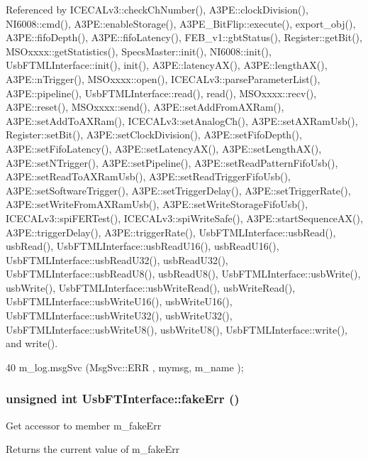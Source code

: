 Referenced by ICECALv3::checkChNumber(), A3PE::clockDivision(), NI6008::cmd(), A3PE::enableStorage(), A3PE\_\-BitFlip::execute(), export\_\-obj(), A3PE::fifoDepth(), A3PE::fifoLatency(), FEB\_\-v1::gbtStatus(), Register::getBit(), MSOxxxx::getStatistics(), SpecsMaster::init(), NI6008::init(), UsbFTMLInterface::init(), init(), A3PE::latencyAX(), A3PE::lengthAX(), A3PE::nTrigger(), MSOxxxx::open(), ICECALv3::parseParameterList(), A3PE::pipeline(), UsbFTMLInterface::read(), read(), MSOxxxx::recv(), A3PE::reset(), MSOxxxx::send(), A3PE::setAddFromAXRam(), A3PE::setAddToAXRam(), ICECALv3::setAnalogCh(), A3PE::setAXRamUsb(), Register::setBit(), A3PE::setClockDivision(), A3PE::setFifoDepth(), A3PE::setFifoLatency(), A3PE::setLatencyAX(), A3PE::setLengthAX(), A3PE::setNTrigger(), A3PE::setPipeline(), A3PE::setReadPatternFifoUsb(), A3PE::setReadToAXRamUsb(), A3PE::setReadTriggerFifoUsb(), A3PE::setSoftwareTrigger(), A3PE::setTriggerDelay(), A3PE::setTriggerRate(), A3PE::setWriteFromAXRamUsb(), A3PE::setWriteStorageFifoUsb(), ICECALv3::spiFERTest(), ICECALv3::spiWriteSafe(), A3PE::startSequenceAX(), A3PE::triggerDelay(), A3PE::triggerRate(), UsbFTMLInterface::usbRead(), usbRead(), UsbFTMLInterface::usbReadU16(), usbReadU16(), UsbFTMLInterface::usbReadU32(), usbReadU32(), UsbFTMLInterface::usbReadU8(), usbReadU8(), UsbFTMLInterface::usbWrite(), usbWrite(), UsbFTMLInterface::usbWriteRead(), usbWriteRead(), UsbFTMLInterface::usbWriteU16(), usbWriteU16(), UsbFTMLInterface::usbWriteU32(), usbWriteU32(), UsbFTMLInterface::usbWriteU8(), usbWriteU8(), UsbFTMLInterface::write(), and write().


\begin{DoxyCode}
40 { m_log.msgSvc (MsgSvc::ERR     , mymsg, m_name ); }
\end{DoxyCode}
\hypertarget{classUsbFTInterface_abb29c7f73506259ef57d1e25204f8f7c}{
\subsubsection[{fakeErr}]{\setlength{\rightskip}{0pt plus 5cm}unsigned int UsbFTInterface::fakeErr ()}}
\label{classUsbFTInterface_abb29c7f73506259ef57d1e25204f8f7c}
Get accessor to member m\_\-fakeErr \begin{DoxyReturn}{Returns}
the current value of m\_\-fakeErr 
\end{DoxyReturn}


